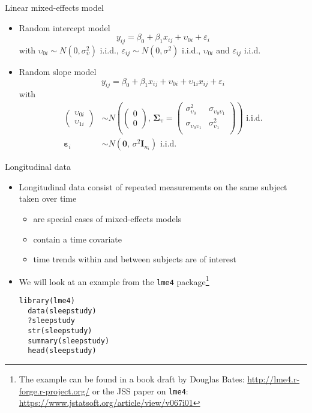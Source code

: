 \documentclass{beamer}
\newcommand{\vect}[1]{\mathbf{#1}}
\newcommand{\mat}[1]{\mathbf{#1}}
\newcommand{\gvect}[1]{\boldsymbol{#1}}
\newcommand{\gmat}[1]{\boldsymbol{#1}}
\begin{document}
\begin{frame}{Linear mixed-effects model}
\begin{itemize}
  \item Random intercept model
\[y_{ij} = \beta_0 + \beta_1 x_{ij} + \upsilon_{0i} + \varepsilon_i\]
with $\upsilon_{0i} \sim N(0, \sigma^2_{\upsilon})$ i.i.d.,
$\varepsilon_{ij} \sim N(0, \sigma^2)$ i.i.d., $\upsilon_{0i}$ and
$\varepsilon_{ij}$ i.i.d.\\[2ex]
  \item Random slope model
\[y_{ij} = \beta_0 + \beta_1 x_{ij} + \upsilon_{0i} + \upsilon_{1i} x_{ij} + \varepsilon_i\]
with
\begin{align*}
  \begin{pmatrix} \upsilon_{0i}\\ \upsilon_{1i} \end{pmatrix} &\sim
    N \left(\begin{pmatrix} 0\\ 0 \end{pmatrix}, \, \gmat{\Sigma}_\upsilon =
      \begin{pmatrix}
        \sigma^2_{\upsilon_0} & \sigma_{\upsilon_0 \upsilon_1} \\
        \sigma_{\upsilon_0 \upsilon_1} & \sigma^2_{\upsilon_1} \\
      \end{pmatrix} \right)
    \text{ i.i.d.} \\
  \gvect{\varepsilon}_i &\sim N(\vect{0}, \, \sigma^2 \mat{I}_{n_i})
    \text{ i.i.d.}
\end{align*}
\end{itemize}
\end{frame}


\begin{frame}[fragile]{Longitudinal data}
  \begin{itemize}
    \item Longitudinal data consist of repeated measurements on the same
      subject taken over time
  \begin{itemize}
    \item are special cases of mixed-effects models
    \item contain a time covariate
    \item time trends within and between subjects are of interest
  \end{itemize}
\item We will look at an example from the \texttt{lme4}
  package\footnote{The example can be found in a book draft by Douglas
      Bates: \url{http://lme4.r-forge.r-project.org/} or the JSS paper on
      \texttt{lme4}: \url{https://www.jstatsoft.org/article/view/v067i01}}
  \begin{lstlisting}[style=plain]
  library(lme4)
  data(sleepstudy)
  ?sleepstudy
  str(sleepstudy)
  summary(sleepstudy)
  head(sleepstudy)
  \end{lstlisting}
  \end{itemize}
\nocite{Bates2010lme4}
\end{frame}
\end{document}
